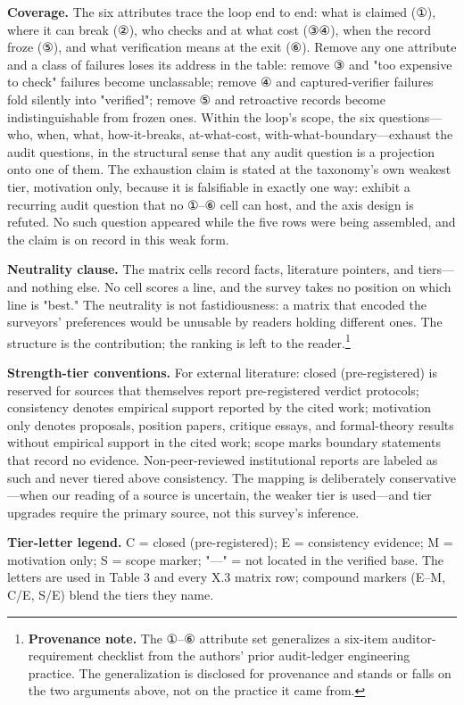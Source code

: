 \documentclass[11pt,a4paper]{article}
\begin{document}
\textbf{Coverage.} The six attributes trace the loop end to end: what is claimed (①), where it can break (②), who checks and at what cost (③④), when the record froze (⑤), and what verification means at the exit (⑥). Remove any one attribute and a class of failures loses its address in the table: remove ③ and "too expensive to check" failures become unclassable; remove ④ and captured-verifier failures fold silently into "verified"; remove ⑤ and retroactive records become indistinguishable from frozen ones. Within the loop's scope, the six questions—who, when, what, how-it-breaks, at-what-cost, with-what-boundary—exhaust the audit questions, in the structural sense that any audit question is a projection onto one of them. The exhaustion claim is stated at the taxonomy's own weakest tier, motivation only, because it is falsifiable in exactly one way: exhibit a recurring audit question that no ①–⑥ cell can host, and the axis design is refuted. No such question appeared while the five rows were being assembled, and the claim is on record in this weak form.

\textbf{Neutrality clause.} The matrix cells record facts, literature pointers, and tiers—and nothing else. No cell scores a line, and the survey takes no position on which line is "best." The neutrality is not fastidiousness: a matrix that encoded the surveyors' preferences would be unusable by readers holding different ones. The structure is the contribution; the ranking is left to the reader.\footnote{\textbf{Provenance note.} The ①–⑥ attribute set generalizes a six-item auditor-requirement checklist from the authors' prior audit-ledger engineering practice. The generalization is disclosed for provenance and stands or falls on the two arguments above, not on the practice it came from.}

\textbf{Strength-tier conventions.} For external literature: closed (pre-registered) is reserved for sources that themselves report pre-registered verdict protocols; consistency denotes empirical support reported by the cited work; motivation only denotes proposals, position papers, critique essays, and formal-theory results without empirical support in the cited work; scope marks boundary statements that record no evidence. Non-peer-reviewed institutional reports are labeled as such and never tiered above consistency. The mapping is deliberately conservative—when our reading of a source is uncertain, the weaker tier is used—and tier upgrades require the primary source, not this survey's inference.

\textbf{Tier-letter legend.} C = closed (pre-registered); E = consistency evidence; M = motivation only; S = scope marker; "—" = not located in the verified base. The letters are used in Table 3 and every X.3 matrix row; compound markers (E–M, C/E, S/E) blend the tiers they name.
\end{document}
